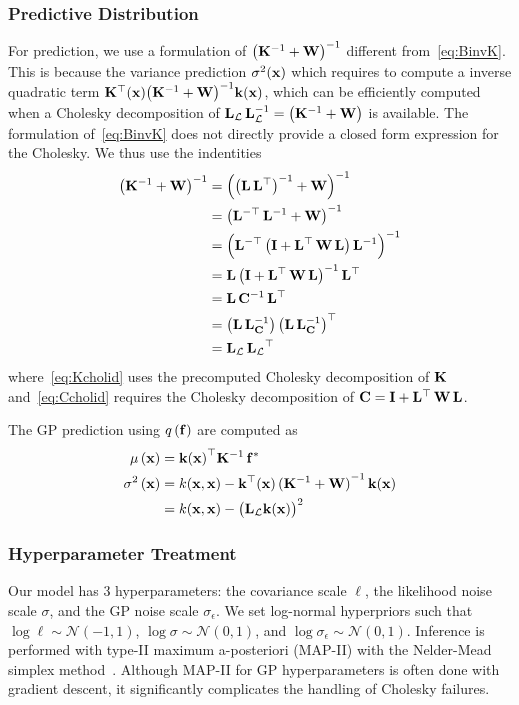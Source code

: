 \subsubsection{Predictive Distribution}
For prediction, we use a formulation of \({\big(\mathbf{K}^{-1} + \mathbf{W}\big)}^{-1}\) different from~\cref{eq:BinvK}.
This is because the variance prediction \(\sigma^2(\mathbf{x})\) which requires to compute a inverse quadratic term \(\mathbf{K}^{\top}(\mathbf{x}) {\big(\mathbf{K}^{-1} + \mathbf{W}\big)}^{-1} \mathbf{k}(\mathbf{x})\), which can be efficiently computed when a Cholesky decomposition of \(\mathbf{L}_{\mathcal{L}} \, \mathbf{L}^{-1}_{\mathcal{L}}  = {\big(\mathbf{K}^{-1} + \mathbf{W}\big)}\) is available.
The formulation of~\cref{eq:BinvK} does not directly provide a closed form expression for the Cholesky.
We thus use the indentities
\begin{align}
  {\big(\mathbf{K}^{-1} + \mathbf{W}\big)}^{-1}
  &= { \Big({\big(\mathbf{L}\,\mathbf{L}^{\top}\big)}^{-1} + \mathbf{W} \Big) }^{-1} \label{eq:Kcholid}  \\
  &= { \big(\mathbf{L}^{-\top}\,\mathbf{L}^{-1} + \mathbf{W} \big) }^{-1}  \\
  &= { \Big( \mathbf{L}^{-\top}\,\big(\mathbf{I} + \mathbf{L}^{\top}\,\mathbf{W}\,\mathbf{L} \big)\,\mathbf{L}^{-1} \Big) }^{-1}  \\
  &= \mathbf{L}\,{\big(\mathbf{I} + \mathbf{L}^{\top}\,\mathbf{W}\,\mathbf{L} \big)}^{-1}\,\mathbf{L}^{\top}  \\
  &= \mathbf{L}\, \mathbf{C}^{-1} \,\mathbf{L}^{\top}  \\
  &= \big( \mathbf{L}\, \mathbf{L}_{\mathbf{C}}^{-1} \big)\, {\big( \mathbf{L}\, \mathbf{L}_{\mathbf{C}}^{-1} \big)}^{\top} \label{eq:Ccholid} \\
  &= \mathbf{L}_{\mathcal{L}} \, { \mathbf{L}_{\mathcal{L}} }^{\top}
\end{align}
where~\cref{eq:Kcholid} uses the precomputed Cholesky decomposition of \(\mathbf{K}\) and~\cref{eq:Ccholid} requires the Cholesky decomposition of \(\mathbf{C} = \mathbf{I} + \mathbf{L}^{\top}\,\mathbf{W}\,\mathbf{L}\).

The GP prediction using \(q\,(\mathbf{f})\) are computed as
\begin{align}
  \mu\,(\mathbf{x})
  &= {\mathbf{k}(\mathbf{x})}^{\top} \mathbf{K}^{-1} \, \mathbf{f}^*  \\
  \sigma^2\,(\mathbf{x})
  &= k(\mathbf{x}, \mathbf{x}) - \mathbf{k}^{\top}(\mathbf{x}) \, {(\mathbf{K}^{-1} + \mathbf{W})}^{-1} \, \mathbf{k}(\mathbf{x}) \\
  &= k(\mathbf{x}, \mathbf{x}) - {\big( \mathbf{L}_{\mathcal{L}} \mathbf{k}(\mathbf{x}) \big)}^2
\end{align}

\subsubsection{Hyperparameter Treatment}
Our model has 3 hyperparameters: the covariance scale \(\ell\), the likelihood noise scale \(\sigma\), and the GP noise scale \(\sigma_\epsilon\).
We set log-normal hyperpriors such that \(\log \ell \sim \mathcal{N}\left(-1, 1\right)\), \(\log \sigma \sim \mathcal{N}\left(0, 1\right)\), and \(\log \sigma_{\epsilon} \sim \mathcal{N}\left(0, 1\right)\).
Inference is performed with type-II maximum a-posteriori (MAP-II) with the Nelder-Mead simplex method~\cite{nelder_simplex_1965}.
Although MAP-II for GP hyperparameters is often done with gradient descent, it significantly complicates the handling of Cholesky failures.

